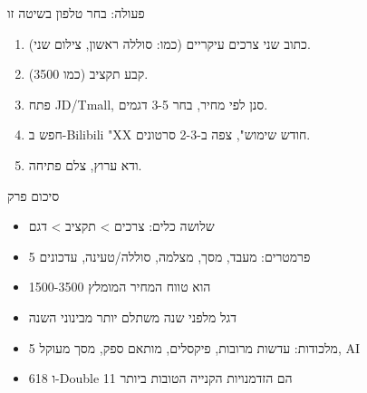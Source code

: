 \begin{tcbpractice}{פעולה: בחר טלפון בשיטה זו}
\begin{enumerate}
  \item כתוב שני צרכים עיקריים (כמו: סוללה ראשון, צילום שני).
  \item קבע תקציב (כמו 3500).
  \item פתח JD/Tmall, סנן לפי מחיר, בחר 3-5 דגמים.
  \item חפש ב-Bilibili "XX חודש שימוש", צפה ב-2-3 סרטונים.
  \item ודא ערוץ, צלם פתיחה.
\end{enumerate}

\end{tcbpractice}

\begin{tcbsummary}{סיכום פרק}
\begin{itemize}
  \item שלושה כלים: צרכים > תקציב > דגם
  \item 5 פרמטרים: מעבד, מסך, מצלמה, סוללה/טעינה, עדכונים
  \item 1500-3500 הוא טווח המחיר המומלץ
  \item דגל מלפני שנה משתלם יותר מבינוני השנה
  \item 5 מלכודות: עדשות מרובות, פיקסלים, מותאם ספק, מסך מעוקל, AI
  \item 618 ו-Double 11 הם הזדמנויות הקנייה הטובות ביותר
\end{itemize}

\end{tcbsummary}
